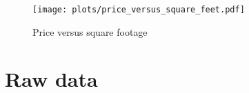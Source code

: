 \documentclass[
10pt, %
a4paper, %
oneside, %
headinclude,footinclude, %
BCOR5mm, %
]{scrartcl}
\begin{document}
\begin{figure}[tb]
\centering
\caption{Price versus square footage} \label{fig:price_versus_square_feet}  
\texttt{[image: plots/price\_versus\_square\_feet.pdf]} 
\end{figure}


\renewcommand{\refname}{\spacedlowsmallcaps{References}} %


\appendix
\section{Raw data} \label{sec:raw_data} 
\end{document}
